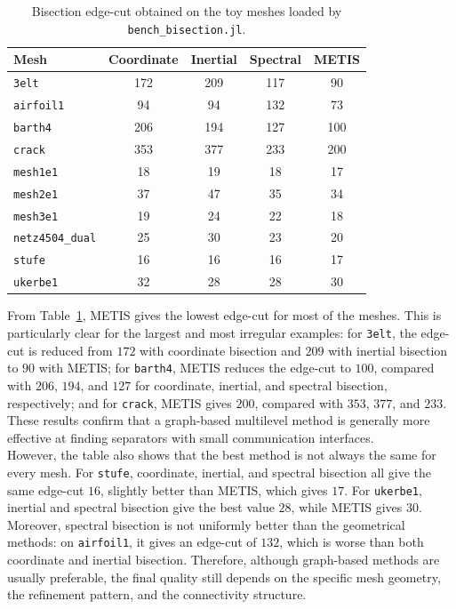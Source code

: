 \documentclass[unicode,10pt,a4paper,oneside,numbers=endperiod,openany]{scrartcl}
\begin{document}
\begin{table}[h]
\centering
\begin{tabular}{lcccc}
\hline
\textbf{Mesh} & \textbf{Coordinate} & \textbf{Inertial} & \textbf{Spectral} & \textbf{METIS} \\
\hline
\texttt{3elt}           & 172 & 209 & 117 & 90  \\
\texttt{airfoil1}       & 94  & 94  & 132 & 73  \\
\texttt{barth4}         & 206 & 194 & 127 & 100 \\
\texttt{crack}          & 353 & 377 & 233 & 200 \\
\texttt{mesh1e1}        & 18  & 19  & 18  & 17  \\
\texttt{mesh2e1}        & 37  & 47  & 35  & 34  \\
\texttt{mesh3e1}        & 19  & 24  & 22  & 18  \\
\texttt{netz4504\_dual} & 25  & 30  & 23  & 20  \\
\texttt{stufe}          & 16  & 16  & 16  & 17  \\
\texttt{ukerbe1}        & 32  & 28  & 28  & 30  \\
\hline
\end{tabular}
\caption{Bisection edge-cut obtained on the toy meshes loaded by \texttt{bench\_bisection.jl}.}
\label{tab:bisection_edgecuts}
\end{table}

From Table~\ref{tab:bisection_edgecuts}, METIS gives the lowest edge-cut for most of the
meshes. This is particularly clear for the largest and most irregular examples:
for \texttt{3elt}, the edge-cut is reduced from \(172\) with coordinate bisection and \(209\)
with inertial bisection to \(90\) with METIS; for \texttt{barth4}, METIS reduces the edge-cut
to \(100\), compared with \(206\), \(194\), and \(127\) for coordinate, inertial, and spectral
bisection, respectively; and for \texttt{crack}, METIS gives \(200\), compared with \(353\),
\(377\), and \(233\). These results confirm that a graph-based multilevel method is generally
more effective at finding separators with small communication interfaces.\\

However, the table also shows that the best method is not always the same for every mesh.
For \texttt{stufe}, coordinate, inertial, and spectral bisection all give the same edge-cut
\(16\), slightly better than METIS, which gives \(17\). For \texttt{ukerbe1}, inertial and
spectral bisection give the best value \(28\), while METIS gives \(30\). Moreover, spectral
bisection is not uniformly better than the geometrical methods: on \texttt{airfoil1}, it gives
an edge-cut of \(132\), which is worse than both coordinate and inertial bisection. Therefore,
although graph-based methods are usually preferable, the final quality still depends on the
specific mesh geometry, the refinement pattern, and the connectivity structure.
\end{document}
